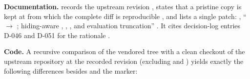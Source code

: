 \begin{specdelta}
\label{delta:vendor}
\textbf{Documentation.}  records the
upstream revision 
, states that a pristine copy is kept
at  from which the complete diff
is reproducible , and lists a single
patch: , `` $\to$ ; hiding-aware , ,
, and evaluation truncation''
. It cites decision-log entries
D-046 and D-051 for the rationale .

\textbf{Code.} A recursive comparison of the vendored tree with a clean
checkout of the upstream repository at the recorded revision (excluding
 and ) yields exactly the following differences
besides  and the  marker:


\end{specdelta}
